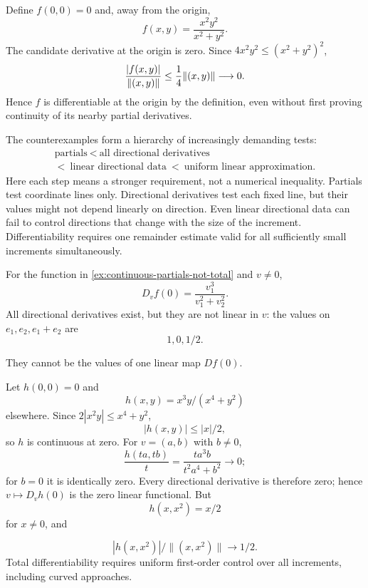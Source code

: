 \begin{example}
Define $f(0,0)=0$ and, away from the origin,
\[
f(x,y)=\frac{x^2y^2}{x^2+y^2}.
\]
The candidate derivative at the origin is zero.  Since
$4x^2y^2\leq(x^2+y^2)^2$,
\[
\frac{\lvert f(x,y)\rvert}{\lVert (x,y)\rVert}
\leq\frac14\lVert (x,y)\rVert\longrightarrow0.
\]
Hence $f$ is differentiable at the origin by the definition, even without
first proving continuity of its nearby partial derivatives.
\end{example}

The counterexamples form a hierarchy of increasingly demanding tests:
\[
\begin{gathered}
\text{partials}\ <\ \text{all directional derivatives}\\
<\ \text{linear directional data}\ <\ \text{uniform linear approximation}.
\end{gathered}
\]
Here each step means a stronger requirement, not a numerical inequality.
Partials test coordinate lines only. Directional derivatives test each
fixed line, but their values might not depend linearly on direction.
Even linear directional data can fail to control directions that change
with the size of the increment. Differentiability requires one remainder
estimate valid for all sufficiently small increments simultaneously.
\begin{remark}
For the function in \cref{ex:continuous-partials-not-total} and $v\ne0$,
\[
D_vf(0)=\frac{v_1^3}{v_1^2+v_2^2}.
\]
All directional derivatives exist, but they are not linear in $v$:
the values on $e_1,e_2,e_1+e_2$ are
\[
1,0,1/2.
\]

They cannot be the values of one linear map $Df(0)$.
\end{remark}







\begin{example}
Let $h(0,0)=0$ and
\[
h(x,y)=x^3y/(x^4+y^2)
\]
 elsewhere.
Since $2|x^2y|\leq x^4+y^2$,
\[
|h(x,y)|\leq|x|/2,
\]
 so $h$ is continuous
at zero. For $v=(a,b)$ with $b\ne0$,
\[
\frac{h(ta,tb)}t=\frac{t a^3b}{t^2a^4+b^2}\longrightarrow0;
\]
for $b=0$ it is identically zero. Every directional derivative is therefore
zero; hence $v\mapsto D_vh(0)$ is the zero linear functional. But
\[
h(x,x^2)=x/2
\]
 for $x\ne0$, and

\[
|h(x,x^2)|/\|(x,x^2)\|\to1/2.
\]
 Total differentiability requires
uniform first-order control over all increments, including curved approaches.
\end{example}

